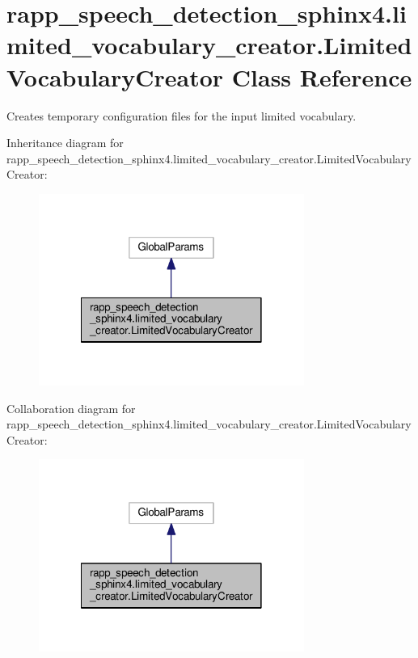 \hypertarget{classrapp__speech__detection__sphinx4_1_1limited__vocabulary__creator_1_1LimitedVocabularyCreator}{\section{rapp\-\_\-speech\-\_\-detection\-\_\-sphinx4.\-limited\-\_\-vocabulary\-\_\-creator.\-Limited\-Vocabulary\-Creator Class Reference}
\label{classrapp__speech__detection__sphinx4_1_1limited__vocabulary__creator_1_1LimitedVocabularyCreator}
}


Creates temporary configuration files for the input limited vocabulary.  




Inheritance diagram for rapp\-\_\-speech\-\_\-detection\-\_\-sphinx4.\-limited\-\_\-vocabulary\-\_\-creator.\-Limited\-Vocabulary\-Creator\-:
\nopagebreak
\begin{figure}[H]
\begin{center}
\leavevmode
\includegraphics[width=246pt]{classrapp__speech__detection__sphinx4_1_1limited__vocabulary__creator_1_1LimitedVocabularyCreator__inherit__graph}
\end{center}
\end{figure}


Collaboration diagram for rapp\-\_\-speech\-\_\-detection\-\_\-sphinx4.\-limited\-\_\-vocabulary\-\_\-creator.\-Limited\-Vocabulary\-Creator\-:
\nopagebreak
\begin{figure}[H]
\begin{center}
\leavevmode
\includegraphics[width=246pt]{classrapp__speech__detection__sphinx4_1_1limited__vocabulary__creator_1_1LimitedVocabularyCreator__coll__graph}
\end{center}
\end{figure}
